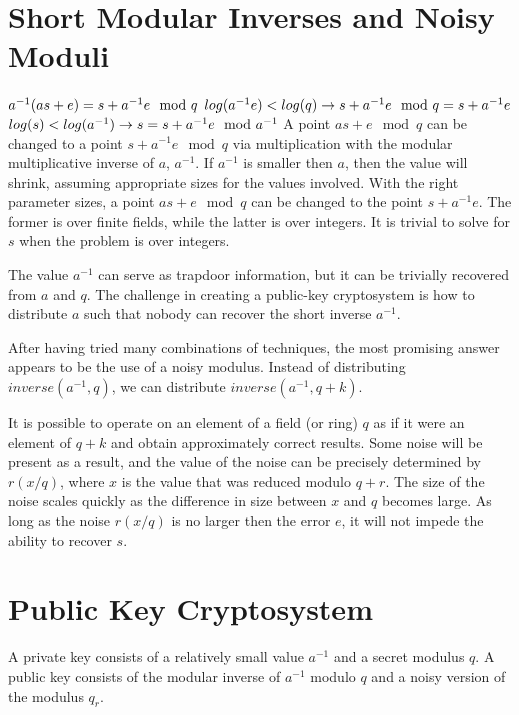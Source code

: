 \documentclass[preprint]{iacrtrans}
\begin{document}
\section{Short Modular Inverses and Noisy Moduli}
$a^{-1} (a s + e) = s + a^{-1} e \mod q\\ \\$
$log(a^{-1} e) < log(q) \rightarrow s + a^{-1} e \mod q = s + a^{-1} e\\ \\$
$log(s) < log(a^{-1}) \rightarrow s = s + a^{-1} e \mod a^{-1}\\ \\$
A point $a s + e \mod q$  can be changed to a point $s + a^{-1} e \mod q$ via multiplication with the modular multiplicative inverse of $a$, $a^{-1}$. If $a^{-1}$ is smaller then $a$, then the value will shrink, assuming appropriate sizes for the values involved. With the right parameter sizes, a point $a s + e \mod q$ can be changed to the point $s + a^{-1} e$. The former is over finite fields, while the latter is over integers. It is trivial to solve for $s$ when the problem is over integers.

The value $a^{-1}$ can serve as trapdoor information, but it can be trivially recovered from $a$ and $q$. The challenge in creating a public-key cryptosystem is how to distribute $a$ such that nobody can recover the short inverse $a^{-1}$.

After having tried many combinations of techniques, the most promising answer appears to be the use of a noisy modulus. Instead of distributing $inverse(a^{-1}, q)$, we can distribute $inverse(a^{-1}, q + k)$.

It is possible to operate on an element of a field (or ring) $q$ as if it were an element of $q + k$ and obtain approximately correct results. Some noise will be present as a result, and the value of the noise can be precisely determined by $r (x / q)$, where $x$ is the value that was reduced modulo $q + r$. The size of the noise scales quickly as the difference in size between $x$ and $q$ becomes large. As long as the noise $r (x / q)$ is no larger then the error $e$, it will not impede the ability to recover $s$.

\section{Public Key Cryptosystem}
A private key consists of a relatively small value $a^{-1}$ and a secret modulus $q$. A public key consists of the modular inverse of $a^{-1}$ modulo $q$ and a noisy version of the modulus $q_r$.  
\end{document}
